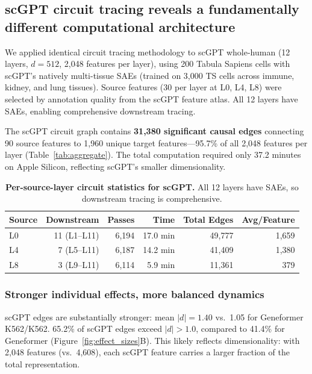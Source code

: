 \documentclass[onecolumn]{article}
\begin{document}
\subsection{scGPT circuit tracing reveals a fundamentally different computational architecture}
\label{sec:scgpt}

We applied identical circuit tracing methodology to scGPT whole-human (12 layers, $d{=}512$, 2,048 features per layer), using 200 Tabula Sapiens cells with scGPT's natively multi-tissue SAEs (trained on 3,000 TS cells across immune, kidney, and lung tissues). Source features (30 per layer at L0, L4, L8) were selected by annotation quality from the scGPT feature atlas. All 12 layers have SAEs, enabling comprehensive downstream tracing.

The scGPT circuit graph contains \textbf{31,380 significant causal edges} connecting 90 source features to 1,960 unique target features---95.7\% of all 2,048 features per layer (Table~\ref{tab:aggregate}). The total computation required only 37.2 minutes on Apple Silicon, reflecting scGPT's smaller dimensionality.

\begin{table}[t]
\centering
\caption{\textbf{Per-source-layer circuit statistics for scGPT.} All 12 layers have SAEs, so downstream tracing is comprehensive.}
\label{tab:scgpt_perlayer}
\smallskip
\begin{tabular}{lrrrrr}
\toprule
Source & Downstream & Passes & Time & Total Edges & Avg/Feature \\
\midrule
L0 & 11 (L1--L11) & 6,194 & 17.0 min & 49,777 & 1,659 \\
L4 & 7 (L5--L11) & 6,187 & 14.2 min & 41,409 & 1,380 \\
L8 & 3 (L9--L11) & 6,114 & 5.9 min & 11,361 & 379 \\
\bottomrule
\end{tabular}
\end{table}


\subsubsection{Stronger individual effects, more balanced dynamics}

scGPT edges are substantially stronger: mean $|d| = 1.40$ vs.\ 1.05 for Geneformer K562/K562. 65.2\% of scGPT edges exceed $|d| > 1.0$, compared to 41.4\% for Geneformer (Figure~\ref{fig:effect_sizes}B). This likely reflects dimensionality: with 2,048 features (vs.\ 4,608), each scGPT feature carries a larger fraction of the total representation.
\end{document}
